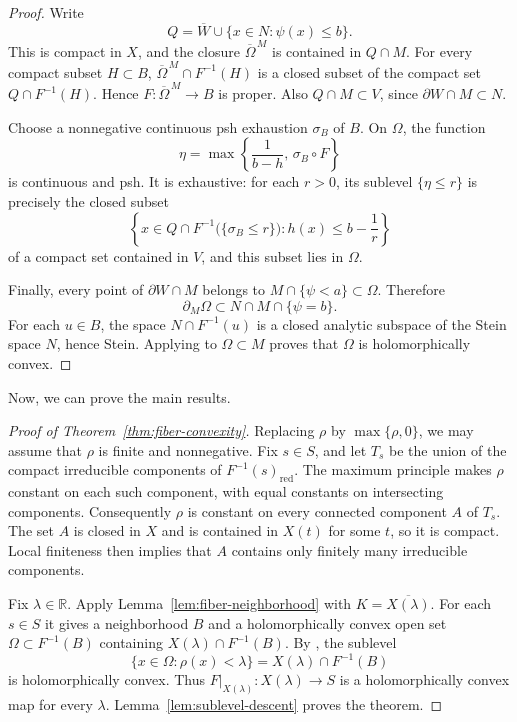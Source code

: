 \documentclass[11pt]{amsart}
\theoremstyle{definition}
\theoremstyle{remark}
\numberwithin{equation}{section}
\newcommand{\R}{\mathbb R}
\begin{document}
\begin{proof}
Write
\[
 Q=\overline W\cup\{x\in N:\psi(x)\le b\}.
\]
This is compact in $X$, and the closure
$\overline\Omega^{\,M}$ is contained in $Q\cap M$.
For every compact subset $H\subset B$,
$\overline\Omega^{\,M}\cap F^{-1}(H)$ is a closed subset of
the compact set $Q\cap F^{-1}(H)$. Hence
$F:\overline\Omega^{\,M}\to B$ is proper.
Also $Q\cap M\subset V$, since $\partial W\cap M\subset N$.

Choose a nonnegative continuous psh exhaustion $\sigma_B$
of $B$. On $\Omega$, the function
\[
 \eta=\max\left\{\frac1{b-h},\,\sigma_B\circ F\right\}
\]
is continuous and psh. It is exhaustive: for each $r>0$,
its sublevel $\{\eta\le r\}$ is precisely the closed subset
\[
 \left\{x\in Q\cap
 F^{-1}\bigl(\{\sigma_B\le r\}\bigr):
 h(x)\le b-\frac1r\right\}
\]
of a compact set contained in $V$, and this subset lies in
$\Omega$.

Finally, every point of $\partial W\cap M$ belongs to
$M\cap\{\psi<a\}\subset\Omega$. Therefore
\[
 \partial_M\Omega\subset N\cap M\cap\{\psi=b\}.
\]
For each $u\in B$, the space $N\cap F^{-1}(u)$ is a closed
analytic subspace of the Stein space $N$, hence Stein.
Applying \cite[Corollary~2.5]{VijituForum2022} to
$\Omega\subset M$ proves that $\Omega$ is holomorphically
convex.
\end{proof}
Now, we can prove the main results.
\begin{proof}[Proof of Theorem~\ref{thm:fiber-convexity}]
Replacing $\rho$ by $\max\{\rho,0\}$, we may assume that
$\rho$ is finite and nonnegative.
Fix $s\in S$, and let $T_s$ be the union of the compact
irreducible components of $F^{-1}(s)_{\mathrm{red}}$.
The maximum principle makes $\rho$ constant on each such
component, with equal constants on intersecting components.
Consequently $\rho$ is constant on every connected component
$A$ of $T_s$. The set $A$ is closed in $X$ and is contained
in $X(t)$ for some $t$, so it is compact. Local finiteness
then implies that $A$ contains only finitely many irreducible
components.

Fix $\lambda\in\R$. Apply Lemma~\ref{lem:fiber-neighborhood}
with $K=\overline{X(\lambda)}$. For each $s\in S$ it gives
a neighborhood $B$ and a holomorphically convex open set
$\Omega\subset F^{-1}(B)$ containing
$X(\lambda)\cap F^{-1}(B)$.
By \cite[Proposition~4.4]{Vajaitu2022}, the sublevel
\[
 \{x\in\Omega:\rho(x)<\lambda\}
 =X(\lambda)\cap F^{-1}(B)
\]
is holomorphically convex.
Thus $F|_{X(\lambda)}:X(\lambda)\to S$ is a holomorphically
convex map for every $\lambda$.
Lemma~\ref{lem:sublevel-descent} proves the theorem.
\end{proof}
\end{document}
